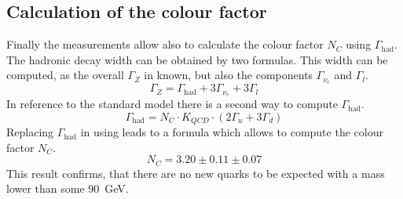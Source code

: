 \documentclass[epj,nopacs]{svjour}
\begin{document}
\subsection{Calculation of the colour factor}

Finally the measurements allow also to calculate the colour factor $N_C$ using
$Γ_{\mathrm{had}}$. The hadronic decay width can be obtained by two formulas.
This width can be computed, as the overall $Γ_Z$ in known, but also the components
$Γ_{ν_e}$ and $Γ_l$.
\begin{equation}
 Γ_Z = Γ_{\mathrm{had}} + 3Γ_{ν_e} + 3Γ_l
 \label{eqn:gammahad1}
\end{equation}
In reference to the standard model there is a second way to compute $Γ_{\mathrm{had}}$.
\begin{equation}
 Γ_{\mathrm{had}} = N_C \cdot K_{QCD}\cdot ( 2Γ_u + 3Γ_d )
 \label{eqn:gammahad2}
\end{equation}
Replacing $Γ_{\mathrm{had}}$ in  using  leads to a
formula which allows to compute the colour factor $N_C$.
\begin{equation}
 N_C = 3.20 \pm 0.11 \pm 0.07
\end{equation}
This result confirms, that there are no new quarks to be expected with a mass
lower than some \SI{90}{\GeV}.

\end{document}
